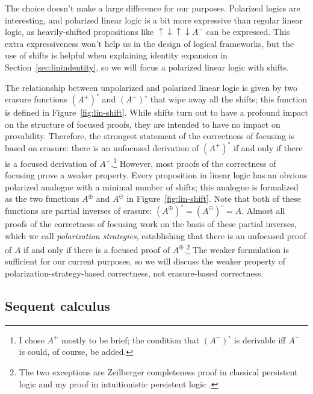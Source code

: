 The choice doesn't make a large difference for our purposes.
Polarized logics are interesting, and polarized linear logic is a bit
more expressive than regular linear logic, as heavily-shifted
propositions like ${\uparrow}{\downarrow}{\uparrow}{\downarrow}A^-$
can be expressed. This extra expressiveness won't help us in
the design of logical frameworks, but the use of shifts is helpful
when explaining identity expansion in Section~\ref{sec:linindentity}, 
so we will focus a polarized linear logic with shifts.



The relationship between unpolarized and polarized linear logic is
given by two erasure functions $(A^+)^\circ$ and $(A^-)^\circ$ that
wipe away all the shifts; this function is defined in
Figure~\ref{fig:lin-shift}. While shifts turn out to have a profound
impact on the structure of focused proofs, they are intended to have
no impact on provability. Therefore, the strongest statement of the
correctness of focusing is based on erasure: there is an unfocused
derivation of $(A^+)^\circ$ if and only if there is a focused
derivation of $A^+$.\footnote{I chose $A^+$ mostly to be brief; the
  condition that $(A^-)^\circ$ is derivable iff $A^-$ is could, of
  course, be added.}  However, most proofs of the correctness of
focusing prove a weaker property. Every proposition in linear logic
has an obvious polarized analogue with a minimal number of shifts;
this analogue is formalized as the two functions $A^\oplus$ and
$A^\ominus$ in Figure~\ref{fig:lin-shift}. Note that both of these
functions are partial inverses of erasure: $(A^\oplus)^\circ =
(A^\ominus)^\circ = A$. Almost all proofs of the correctness of
focusing work on the basis of these partial inverses, which we call
{\it polarization strategies}, establishing that there is an unfocused
proof of $A$ if and only if there is a focused proof of
$A^\oplus$.\footnote{The two exceptions are Zeilberger completeness
  proof in classical persistent logic \cite{zeilberger08unity} and my
  proof in intuitionistic persistent logic \cite{simmons11structural}.}
The weaker formulation is sufficient for our current purposes, so we
will discuss the weaker property of polarization-strategy-based
correctness, not erasure-based correctness.

\subsection{Sequent calculus}

